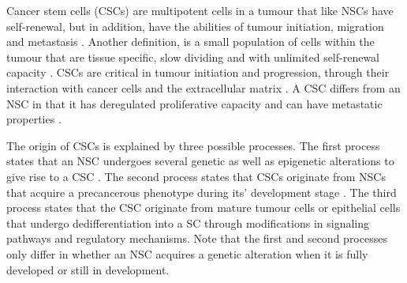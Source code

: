 \documentclass[\main/thesis.tex]{subfiles}
\begin{document}
Cancer stem cells (CSCs) are multipotent cells in a tumour that like NSCs have self-renewal, but in addition, have the abilities of tumour initiation, migration and metastasis \parencite{Biddle,Bu}. Another definition, is a small population of cells within the tumour that are tissue specific, slow dividing and with unlimited self-renewal capacity \parencite{Cabanillas}. CSCs are critical in tumour initiation and progression, through their interaction with cancer cells and the extracellular matrix \parencite{Catalano}. A CSC differs from an NSC in that it has deregulated proliferative capacity and can have metastatic properties \parencite{Cabanillas,Zhou}. 

The origin of CSCs is explained by three possible processes. The first process states that an NSC undergoes several genetic as well as epigenetic alterations to give rise to a CSC \parencite{Feller}. The second process states that CSCs originate from NSCs that acquire a precancerous phenotype during its' development stage \parencite{Bjerkvig,Feller,GonzalezMoles}. The third process states that the CSC originate from mature tumour cells \parencite{DiFiore,HerrerosVillanueva,Kumar,Moon} or epithelial cells \parencite{Bjerkvig,Feller,GonzalezMoles} that undergo dedifferentiation into a SC through modifications in signaling pathways and regulatory mechanisms. Note that the first and second processes only differ in whether an NSC acquires a genetic alteration when it is fully developed or still in development.
\end{document}
